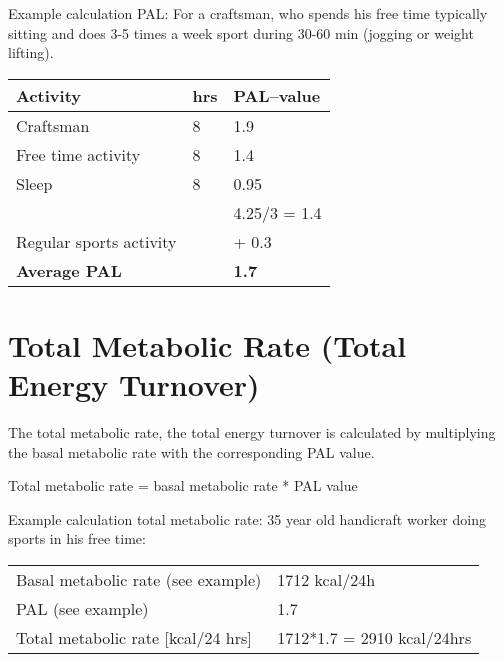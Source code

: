 \documentclass[../main.tex]{subfiles}
\begin{document}
Example calculation PAL:
For a craftsman, who spends his free time typically sitting and does 3-5 times a week sport during 30-60 min (jogging or weight lifting).

  \begin{tabular}{lll}
    \textbf{Activity} & \textbf{hrs} & \textbf{PAL--value} \\
    \hline
    Craftsman & 8 & 1.9 \\
    Free time activity & 8 & 1.4 \\
    Sleep & 8 & 0.95 \\
    \hline
                      & & 4.25/3 = 1.4 \\
    Regular sports activity & & + 0.3 \\
    \hline
    \textbf{Average PAL} & & \textbf{1.7}\\
  \end{tabular}
  \vspace{1mm}

  \section{Total Metabolic Rate (Total Energy Turnover)}

  The total metabolic rate, the total energy turnover is calculated by multiplying the basal metabolic rate with the corresponding PAL value.

  \begin{center}
\begin{fminipage}{9cm}
  Total metabolic rate = basal metabolic rate * PAL value
  \end{fminipage}
\end{center}


\vspace{2mm}
\noindent  Example calculation total metabolic rate:
  35 year old handicraft worker doing sports in his free time:

  \begin{tabular}{ll}
    Basal metabolic rate (see example) & 1712 kcal/24h \\
    PAL (see example) & 1.7 \\
    Total metabolic rate [kcal/24 hrs] & 1712*1.7 = 2910 kcal/24hrs
  \end{tabular}

\vspace{2mm}
\end{document}
